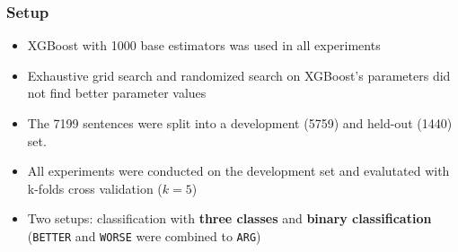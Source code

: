 \documentclass[11pt,aspectratio=169,usenames,dvipsnames]{beamer}
\begin{document}
    \begin{frame}[t]
        \frametitle{Setup}
        \begin{itemize}
            \item XGBoost with 1000 base estimators was used in all experiments
            \item Exhaustive grid search and randomized search on XGBoost's parameters did not find better parameter values\pause
            \item The 7199 sentences were split into a development (5759) and held-out (1440) set.
            \item All experiments were conducted on the development set and evalutated with k-folds cross validation ($k = 5$)\pause
            \item Two setups: classification with \textbf{three classes} and \textbf{binary classification} (\texttt{BETTER} and \texttt{WORSE} were combined to \texttt{ARG})
        \end{itemize}

    \end{frame}
\end{document}
